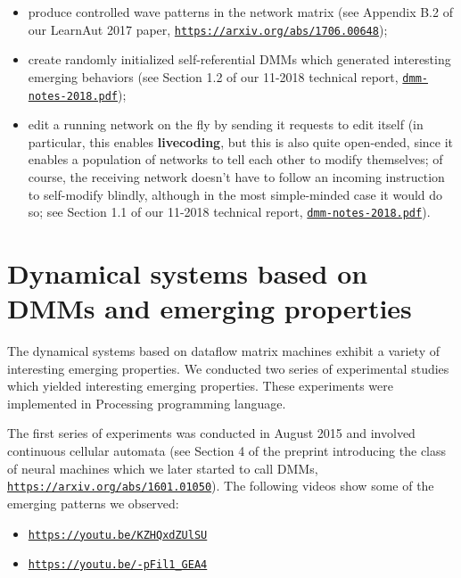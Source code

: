 \documentclass{article}
\begin{document}
  \begin{itemize}
     \item produce controlled wave patterns in the network matrix (see Appendix B.2 of our LearnAut 2017 paper, \href{https://arxiv.org/abs/1706.00648}{\tt https://arxiv.org/abs/1706.00648});
     \item create randomly initialized self-referential DMMs which generated interesting emerging behaviors (see Section 1.2 of our 11-2018 technical report, \href{https://www.cs.brandeis.edu/~bukatin/dmm-notes-2018.pdf}{\tt dmm-notes-2018.pdf});
     \item edit a running network on the fly by sending it requests to edit itself (in particular, this enables {\bf livecoding}, but this is also quite open-ended, since it enables a population of networks to tell each other to modify themselves; of course, the receiving network doesn't have to follow an incoming instruction to self-modify blindly, although in the most simple-minded case it would do so; see Section 1.1 of our 11-2018 technical report, \href{https://www.cs.brandeis.edu/~bukatin/dmm-notes-2018.pdf}{\tt dmm-notes-2018.pdf}).
  \end{itemize}

\section{Dynamical systems based on DMMs and emerging properties}

The dynamical systems based on dataflow
matrix machines exhibit a variety of interesting emerging properties. We conducted two series of experimental studies which yielded interesting emerging properties. These experiments were implemented in Processing programming language.

The first series of experiments was conducted in August 2015 and involved continuous cellular automata (see Section 4 of the preprint introducing the class of neural machines which we later started to call DMMs, \href{https://arxiv.org/abs/1601.01050}{\tt https://arxiv.org/abs/1601.01050}). The following videos show some of the emerging patterns we observed:

\begin{itemize}
   \item \href{https://youtu.be/KZHQxdZUlSU}{\tt https://youtu.be/KZHQxdZUlSU}
   \item \href{https://youtu.be/-pFil1\_GEA4}{\tt https://youtu.be/-pFil1\_GEA4}
\end{itemize}
\end{document}
